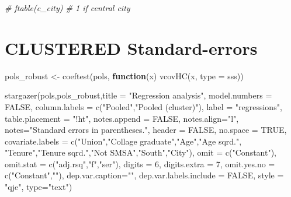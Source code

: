 \documentclass[
]{article}
\newenvironment{Shaded}{\begin{snugshade}}{\end{snugshade}}
\newcommand{\AttributeTok}[1]{\textcolor[rgb]{0.77,0.63,0.00}{#1}}
\newcommand{\CommentTok}[1]{\textcolor[rgb]{0.56,0.35,0.01}{\textit{#1}}}
\newcommand{\ConstantTok}[1]{\textcolor[rgb]{0.00,0.00,0.00}{#1}}
\newcommand{\ControlFlowTok}[1]{\textcolor[rgb]{0.13,0.29,0.53}{\textbf{#1}}}
\newcommand{\DecValTok}[1]{\textcolor[rgb]{0.00,0.00,0.81}{#1}}
\newcommand{\FunctionTok}[1]{\textcolor[rgb]{0.00,0.00,0.00}{#1}}
\newcommand{\NormalTok}[1]{#1}
\newcommand{\OtherTok}[1]{\textcolor[rgb]{0.56,0.35,0.01}{#1}}
\newcommand{\StringTok}[1]{\textcolor[rgb]{0.31,0.60,0.02}{#1}}
\begin{document}
\begin{Shaded}
\begin{Highlighting}[]
\CommentTok{\# ftable(c\_city) \# 1 if central city}
\end{Highlighting}
\end{Shaded}

\hypertarget{clustered-standard-errors}{%
\section{CLUSTERED Standard-errors}\label{clustered-standard-errors}}

\begin{Shaded}
\begin{Highlighting}[]
\NormalTok{  pols\_robust }\OtherTok{\textless{}{-}} \FunctionTok{coeftest}\NormalTok{(pols, }\ControlFlowTok{function}\NormalTok{(x) }\FunctionTok{vcovHC}\NormalTok{(x, }\AttributeTok{type =} \StringTok{\textquotesingle{}sss\textquotesingle{}}\NormalTok{)) }
  
  \FunctionTok{stargazer}\NormalTok{(pols,pols\_robust,}\AttributeTok{title =} \StringTok{"Regression analysis"}\NormalTok{, }
            \AttributeTok{model.numbers =} \ConstantTok{FALSE}\NormalTok{,}
            \AttributeTok{column.labels =} \FunctionTok{c}\NormalTok{(}\StringTok{"Pooled"}\NormalTok{,}\StringTok{"Pooled (cluster)"}\NormalTok{),}
            \AttributeTok{label =} \StringTok{"regressions"}\NormalTok{,}
            \AttributeTok{table.placement =} \StringTok{"!ht"}\NormalTok{,}
            \AttributeTok{notes.append =} \ConstantTok{FALSE}\NormalTok{,}
            \AttributeTok{notes.align=}\StringTok{"l"}\NormalTok{,}
            \AttributeTok{notes=}\StringTok{"Standard errors in parentheses."}\NormalTok{,}
            \AttributeTok{header =} \ConstantTok{FALSE}\NormalTok{,}
            \AttributeTok{no.space =} \ConstantTok{TRUE}\NormalTok{,}
            \AttributeTok{covariate.labels =} \FunctionTok{c}\NormalTok{(}\StringTok{"Union"}\NormalTok{,}\StringTok{"Collage graduate"}\NormalTok{,}\StringTok{"Age"}\NormalTok{,}\StringTok{"Age sqrd."}\NormalTok{,}
                                 \StringTok{"Tenure"}\NormalTok{,}\StringTok{"Tenure sqrd."}\NormalTok{,}\StringTok{"Not SMSA"}\NormalTok{,}\StringTok{"South"}\NormalTok{,}\StringTok{"City"}\NormalTok{),}
            \AttributeTok{omit =} \FunctionTok{c}\NormalTok{(}\StringTok{"Constant"}\NormalTok{),}
            \AttributeTok{omit.stat =} \FunctionTok{c}\NormalTok{(}\StringTok{"adj.rsq"}\NormalTok{,}\StringTok{"f"}\NormalTok{,}\StringTok{"ser"}\NormalTok{),}
            \AttributeTok{digits =} \DecValTok{6}\NormalTok{,}
            \AttributeTok{digits.extra =} \DecValTok{7}\NormalTok{,}
            \AttributeTok{omit.yes.no =} \FunctionTok{c}\NormalTok{(}\StringTok{"Constant"}\NormalTok{,}\StringTok{""}\NormalTok{),}
            \AttributeTok{dep.var.caption=}\StringTok{""}\NormalTok{,}
            \AttributeTok{dep.var.labels.include =} \ConstantTok{FALSE}\NormalTok{,}
            \AttributeTok{style =} \StringTok{"qje"}\NormalTok{,}
            \AttributeTok{type=}\StringTok{"text"}\NormalTok{)}
\end{Highlighting}
\end{Shaded}
\end{document}
